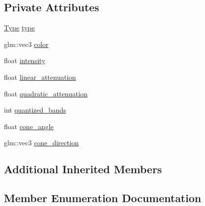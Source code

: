 \subsection*{Private Attributes}
\begin{DoxyCompactItemize}
\item 
\hyperlink{class_graphics_1_1_light_a6c3bc4c73b1bc4a96e0376be4ce0c007}{Type} \hyperlink{class_graphics_1_1_light_a91b3331f89b6e025dfecfdc441a7080f}{type}
\item 
glm\+::vec3 \hyperlink{class_graphics_1_1_light_a903bfd922e53ffe5df769d922928dd0e}{color}
\item 
float \hyperlink{class_graphics_1_1_light_a539a2fdf9981716b6c57a993262631f6}{intensity}
\item 
float \hyperlink{class_graphics_1_1_light_a78d7dd2b77b0b982b68f9738e7c6b5d2}{linear\+\_\+attenuation}
\item 
float \hyperlink{class_graphics_1_1_light_a3820fefaee07fdfc1546a98e1365f2db}{quadratic\+\_\+attenuation}
\item 
int \hyperlink{class_graphics_1_1_light_a1188540a9957321d967d04dd6afec0f5}{quantized\+\_\+bands}
\item 
float \hyperlink{class_graphics_1_1_light_ac3f63577a382c18a9d8c3961df4008c9}{cone\+\_\+angle}
\item 
glm\+::vec3 \hyperlink{class_graphics_1_1_light_ac044f54135fdd638a0426e1e0ef9a63c}{cone\+\_\+direction}
\end{DoxyCompactItemize}
\subsection*{Additional Inherited Members}


\subsection{Member Enumeration Documentation}
\hypertarget{class_graphics_1_1_light_a6c3bc4c73b1bc4a96e0376be4ce0c007}{}
